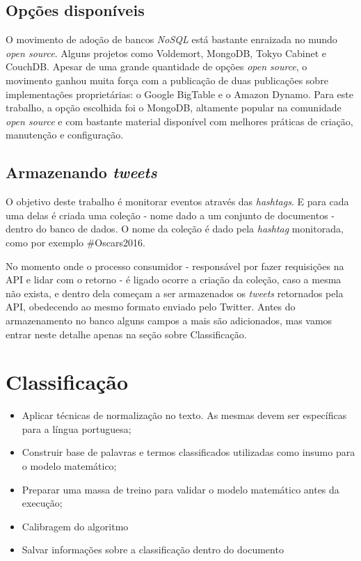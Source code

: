 \subsection{Opções disponíveis}
O movimento de adoção de bancos \textit{NoSQL} está bastante enraizada no mundo \textit{open source}. Alguns projetos como Voldemort\cite{voldemortproject}, MongoDB\cite{mongodb}, Tokyo Cabinet\cite{tokyocabinet} e CouchDB\cite{couchdb}. Apesar de uma grande quantidade de opções \textit{open source}, o movimento ganhou muita força com a publicação de duas publicações sobre implementações proprietárias: o Google BigTable\cite{chang2008bigtable} e o Amazon Dynamo\cite{decandia2007dynamo}. Para este trabalho, a opção escolhida foi o MongoDB, altamente popular na comunidade \textit{open source} e com bastante material disponível com melhores práticas de criação, manutenção e configuração.

\subsection{Armazenando \textit{tweets}}
O objetivo deste trabalho é monitorar eventos através das \textit{hashtags}. E para cada uma delas é criada uma coleção - nome dado a um conjunto de documentos - dentro do banco de dados. O nome da coleção é dado pela \textit{hashtag} monitorada, como por exemplo \mbox{\#Oscars2016}.

No momento onde o processo consumidor - responsável por fazer requisições na API e lidar com o retorno - é ligado ocorre a criação da coleção, caso a mesma não exista, e dentro dela começam a ser armazenados os \textit{tweets} retornados pela API, obedecendo ao mesmo formato enviado pelo Twitter. Antes do armazenamento no banco alguns campos a mais são adicionados, mas vamos entrar neste detalhe apenas na seção sobre Classificação.

\section{Classificação}
\begin{itemize}
	\item Aplicar técnicas de normalização no texto. As mesmas devem ser específicas para a língua portuguesa;
	\item Construir base de palavras e termos classificados utilizadas como insumo para o modelo matemático;
	\item Preparar uma massa de treino para validar o modelo matemático antes da execução;
	\item Calibragem do algoritmo
	\item Salvar informações sobre a classificação dentro do documento
\end{itemize}

